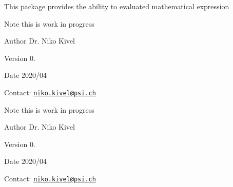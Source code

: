 This package provides the ability to evaluated mathematical expression

\begin{DoxyNote}{Note}
this is work in progress
\end{DoxyNote}
\begin{DoxyAuthor}{Author}
Dr. Niko Kivel
\end{DoxyAuthor}
\begin{DoxyVersion}{Version}
0.
\end{DoxyVersion}
\begin{DoxyDate}{Date}
2020/04
\end{DoxyDate}
Contact\-: \href{mailto:niko.kivel@psi.ch}{\tt niko.\-kivel@psi.\-ch}

\begin{DoxyNote}{Note}
this is work in progress
\end{DoxyNote}
\begin{DoxyAuthor}{Author}
Dr. Niko Kivel
\end{DoxyAuthor}
\begin{DoxyVersion}{Version}
0.
\end{DoxyVersion}
\begin{DoxyDate}{Date}
2020/04
\end{DoxyDate}
Contact\-: \href{mailto:niko.kivel@psi.ch}{\tt niko.\-kivel@psi.\-ch} 